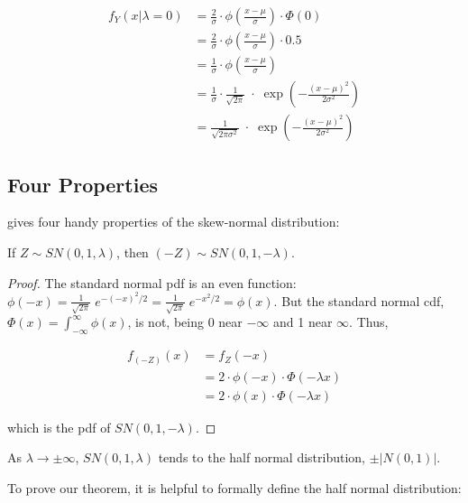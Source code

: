 \documentclass{article}
\begin{document}
\begin{align*}
  f_Y(x|\lambda=0) &= \frac2\sigma \cdot \phi \left( \frac{x-\mu}{\sigma} \right) \cdot \Phi(0) \\
  &= \frac2\sigma \cdot \phi \left( \frac{x-\mu}{\sigma} \right) \cdot 0.5 \\
  &= \frac1\sigma \cdot \phi \left( \frac{x-\mu}{\sigma} \right) \\
  &= \frac1\sigma \cdot \frac{1}{\sqrt{2\pi}} \;\cdot\; \exp \left( -\frac{(x-\mu)^2}{2\sigma^2} \right) \\
  &= \frac{1}{\sqrt{2\pi\sigma^2}} \;\cdot\; \exp \left( -\frac{(x-\mu)^2}{2\sigma^2} \right)
\end{align*}

\subsection{Four Properties}
\label{subsec:four-properties}

\citet{main} gives four handy properties of the skew-normal distribution:

\begin{property} \label{prop:1}
  If $Z \sim SN(0, 1, \lambda)$, then $(-Z) \sim SN(0, 1, -\lambda)$.
\end{property}

\begin{proof}
  The standard normal pdf is an even function: $\phi(-x) =
  \frac{1}{\sqrt{2\pi}}\;e^{-(-x)^2/2} = \frac{1}{\sqrt{2\pi}}\;e^{-x^2/2} =
  \phi(x)$. But the standard normal cdf, \thinspace $\Phi(x) =
  \int_{-\infty}^\infty \phi(x)$, \thinspace is not, being 0 near $-\infty$ and
  1 near $\infty$. Thus,
  
  \begin{align*}
    f_{(-Z)}(x) &= f_Z(-x) \\
    & = 2 \cdot \phi(-x) \cdot \Phi (-\lambda x) \\
    & = 2 \cdot \phi(x) \cdot \Phi (-\lambda x)
  \end{align*}

  which is the pdf of $SN(0, 1, -\lambda)$.
\end{proof}

\begin{property} \label{prop:2}
  As $\lambda \to \pm \infty$, \thinspace $SN(0,1,\lambda)$ tends to the half normal distribution, $\pm |N(0,1)|$.
\end{property}

To prove our theorem, it is helpful to formally define the half normal distribution:
\end{document}
